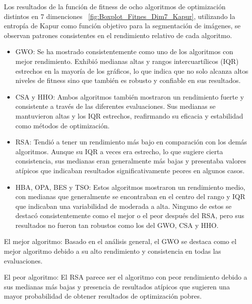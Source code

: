\documentclass[conference]{IEEEtran}
\begin{document}
\noindent Los resultados de la función de fitness de ocho algoritmos de optimización distintos en 7 dimenciones ~\ref{fig:Boxplot_Fitnes_Dim7_Kapur}, utilizando la entropía de Kapur como función objetivo para la segmentación de imágenes, se observan patrones consistentes en el rendimiento relativo de cada algoritmo.
\begin{itemize}
	
\item GWO: Se ha mostrado consistentemente como uno de los algoritmos con mejor rendimiento. Exhibió medianas altas y rangos intercuartílicos (IQR) estrechos en la mayoría de los gráficos, lo que indica que no solo alcanza altos niveles de fitness sino que también es robusto y confiable en sus resultados.

\item CSA y HHO: Ambos algoritmos también mostraron un rendimiento fuerte y consistente a través de las diferentes evaluaciones. Sus medianas se mantuvieron altas y los IQR estrechos, reafirmando su eficacia y estabilidad como métodos de optimización.

\item RSA: Tendió a tener un rendimiento más bajo en comparación con los demás algoritmos. Aunque su IQR a veces era estrecho, lo que sugiere cierta consistencia, sus medianas eran generalmente más bajas y presentaba valores atípicos que indicaban resultados significativamente peores en algunos casos.

\item HBA, OPA, BES y TSO: Estos algoritmos mostraron un rendimiento medio, con medianas que generalmente se encontraban en el centro del rango y IQR que indicaban una variabilidad de moderada a alta. Ninguno de estos se destacó consistentemente como el mejor o el peor después del RSA, pero sus resultados no fueron tan robustos como los del GWO, CSA y HHO.
\end{itemize}

\noindent El mejor algoritmo: Basado en el análisis general, el GWO se destaca como el mejor algoritmo debido a su alto rendimiento y consistencia en todas las evaluaciones.

\noindent El peor algoritmo: El RSA parece ser el algoritmo con peor rendimiento debido a sus medianas más bajas y presencia de resultados atípicos que sugieren una mayor probabilidad de obtener resultados de optimización pobres.
\end{document}
